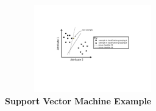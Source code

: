 \documentclass[conference]{IEEEtran}
\begin{document}
\begin{figure}[t]
	\centering
	\includegraphics[height=1.5in, width=3in]{SVM.pdf}
	\caption{\bf Support Vector Machine Example}
	\label{Fig:SVM}
\end{figure}

\end{document}

